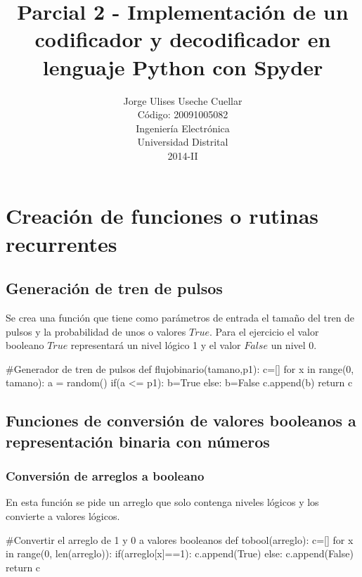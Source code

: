 \documentclass{article}
\title{Parcial 2 - Implementación de un codificador y decodificador en lenguaje Python con Spyder}
\author{Jorge Ulises Useche Cuellar\\
  \small Código: 20091005082\\
  \small Ingeniería Electrónica\\
  \small Universidad Distrital\\
  \small 2014-II
}
\begin{document}
\maketitle


\section{Creación de funciones o rutinas recurrentes}

\subsection{Generación de tren de pulsos}

Se crea una función que tiene como parámetros de entrada el tamaño del tren de pulsos y la probabilidad de unos o valores $True$. Para el ejercicio el valor booleano $True$ representará un nivel lógico 1 y el valor $False$ un nivel 0.

\begin{python}
#Generador de tren de pulsos
def flujobinario(tamano,p1):
    c=[]    
    for x in range(0, tamano):
        a = random()
        if(a <= p1):
            b=True
        else:
            b=False
        c.append(b)
    return c
\end{python}

\subsection{Funciones de conversión de valores booleanos a representación binaria con números}

\subsubsection{Conversión de arreglos a booleano}

En esta función se pide un arreglo que solo contenga niveles lógicos y los convierte a valores lógicos.

\begin{python}
#Convertir el arreglo de 1 y 0 a valores booleanos    
def tobool(arreglo):
    c=[]    
    for x in range(0, len(arreglo)):
        if(arreglo[x]==1):
            c.append(True)
        else:
            c.append(False)
    return c
\end{python}
\end{document}
